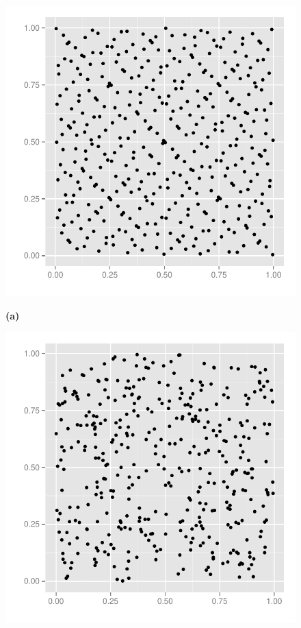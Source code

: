 \documentclass[preprint]{sigplanconf}
\begin{document}
\begin{figure}
  \centering
  \begin{minipage}{0.45\linewidth}
    \begin{center}
      \includegraphics[width=\textwidth]{../report/graphics/2D-sobol-sequence.pdf}

      \hspace{0.55cm}\textbf{(a)}
    \end{center}
  \end{minipage}
  \begin{minipage}{0.45\linewidth}
    \begin{center}
      \includegraphics[width=\textwidth]{../report/graphics/2D-mersenne-sequence.pdf}


\end{center}
\end{minipage}
\end{figure}
\end{document}
